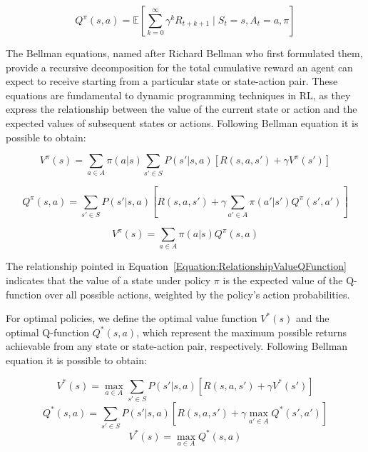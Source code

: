 \begin{equation}
Q^\pi(s, a) = \mathbb{E} \left[ \sum_{k=0}^{\infty} \gamma^k R_{t+k+1} \mid S_t = s, A_t = a, \pi \right]
\end{equation}

The Bellman equations, named after Richard Bellman who first formulated them, provide a recursive decomposition for the total cumulative reward an agent can expect to receive starting from a particular state or state-action pair. These equations are fundamental to dynamic programming techniques in RL, as they express the relationship between the value of the current state or action and the expected values of subsequent states or actions. Following Bellman equation it is possible to obtain:

\begin{equation}
V^\pi(s) = \sum_{a \in A} \pi(a|s) \sum_{s' \in S} P(s'|s,a) \left[ R(s,a,s') + \gamma V^\pi(s') \right]
\end{equation}

\begin{equation}
Q^\pi(s, a) = \sum_{s' \in S} P(s'|s,a) \left[ R(s,a,s') + \gamma \sum_{a' \in A} \pi(a'|s') Q^\pi(s', a') \right]
\end{equation}

\begin{equation}
\label{Equation:RelationshipValueQFunction}
V^\pi(s) = \sum_{a \in A} \pi(a|s) Q^\pi(s, a)
\end{equation}

The relationship pointed in Equation~\ref{Equation:RelationshipValueQFunction} indicates that the value of a state under policy \( \pi \) is the expected value of the Q-function over all possible actions, weighted by the policy's action probabilities.

For optimal policies, we define the optimal value function \( V^*(s) \) and the optimal Q-function \( Q^*(s, a) \), which represent the maximum possible returns achievable from any state or state-action pair, respectively. Following Bellman equation it is possible to obtain:

\begin{equation}
V^*(s) = \max_{a \in A} \sum_{s' \in S} P(s'|s,a) \left[ R(s,a,s') + \gamma V^*(s') \right]
\end{equation}
\begin{equation}
Q^*(s, a) = \sum_{s' \in S} P(s'|s,a) \left[ R(s,a,s') + \gamma \max_{a' \in A} Q^*(s', a') \right]
\end{equation}
\begin{equation}
V^*(s) = \max_{a \in A} Q^*(s, a)
\end{equation}

